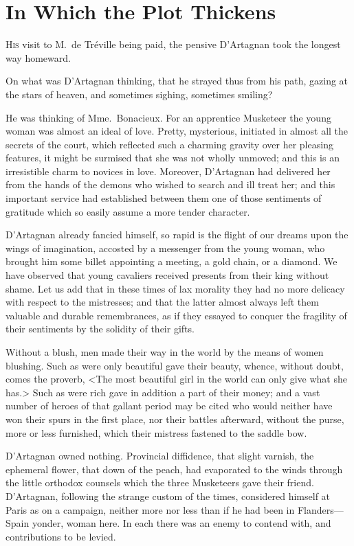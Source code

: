 
\chapter{In Which the Plot Thickens}

\lettrine{H}{is} visit to M.~de Tréville being paid, the pensive D'Artagnan took the longest way homeward. 

\zz
On what was D'Artagnan thinking, that he strayed thus from his path, gazing at the stars of heaven, and sometimes sighing, sometimes smiling? 

He was thinking of Mme.~Bonacieux. For an apprentice Musketeer the young woman was almost an ideal of love. Pretty, mysterious, initiated in almost all the secrets of the court, which reflected such a charming gravity over her pleasing features, it might be surmised that she was not wholly unmoved; and this is an irresistible charm to novices in love. Moreover, D'Artagnan had delivered her from the hands of the demons who wished to search and ill treat her; and this important service had established between them one of those sentiments of gratitude which so easily assume a more tender character. 

D'Artagnan already fancied himself, so rapid is the flight of our dreams upon the wings of imagination, accosted by a messenger from the young woman, who brought him some billet appointing a meeting, a gold chain, or a diamond. We have observed that young cavaliers received presents from their king without shame. Let us add that in these times of lax morality they had no more delicacy with respect to the mistresses; and that the latter almost always left them valuable and durable remembrances, as if they essayed to conquer the fragility of their sentiments by the solidity of their gifts. 

Without a blush, men made their way in the world by the means of women blushing. Such as were only beautiful gave their beauty, whence, without doubt, comes the proverb, <The most beautiful girl in the world can only give what she has.> Such as were rich gave in addition a part of their money; and a vast number of heroes of that gallant period may be cited who would neither have won their spurs in the first place, nor their battles afterward, without the purse, more or less furnished, which their mistress fastened to the saddle bow. 

D'Artagnan owned nothing. Provincial diffidence, that slight varnish, the ephemeral flower, that down of the peach, had evaporated to the winds through the little orthodox counsels which the three Musketeers gave their friend. D'Artagnan, following the strange custom of the times, considered himself at Paris as on a campaign, neither more nor less than if he had been in Flanders—Spain yonder, woman here. In each there was an enemy to contend with, and contributions to be levied. 

